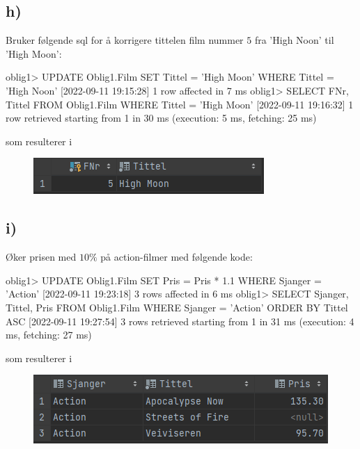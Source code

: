 \documentclass[%
notitlepage,
 amsmath,amssymb,
 aps,
rmp,
]{revtex4-2}  %
\begin{document}
\subsection*{h)}
Bruker følgende sql for å korrigere tittelen film nummer \(5\) fra 'High Noon' til 'High Moon':
\begin{sql}
oblig1> UPDATE Oblig1.Film
        SET Tittel = 'High Moon'
        WHERE Tittel = 'High Noon'
[2022-09-11 19:15:28] 1 row affected in 7 ms
oblig1> SELECT FNr, Tittel
        FROM Oblig1.Film
        WHERE Tittel = 'High Moon'
[2022-09-11 19:16:32] 1 row retrieved starting from 1 in 30 ms (execution: 5 ms, fetching: 25 ms)
\end{sql}
som resulterer i
\begin{figure}[H]
\centering\includegraphics[scale=1]{op1h.png}
\end{figure}

\subsection*{i)}
Øker prisen med \(10\%\) på action-filmer med følgende kode:
\begin{sql}
oblig1> UPDATE Oblig1.Film
        SET Pris = Pris * 1.1
        WHERE Sjanger = 'Action'
[2022-09-11 19:23:18] 3 rows affected in 6 ms
oblig1> SELECT Sjanger, Tittel, Pris
        FROM Oblig1.Film
        WHERE Sjanger = 'Action'
        ORDER BY Tittel ASC
[2022-09-11 19:27:54] 3 rows retrieved starting from 1 in 31 ms (execution: 4 ms, fetching: 27 ms)
\end{sql}
som resulterer i
\begin{figure}[H]
\centering\includegraphics[scale=1]{op1i.png}
\end{figure}
\end{document}
